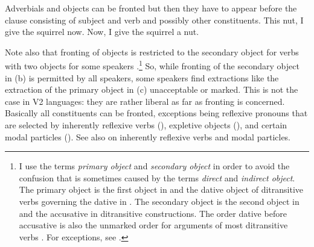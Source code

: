 \eal
{}
\zl 
Adverbials and objects can be fronted but then they have to appear before the clause consisting of
subject and verb and possibly other constituents.
\eal
\ex This nut, I give the squirrel now. 
\ex Now, I give the squirrel a nut.
\zl

\noindent
Note also that fronting of objects is restricted to the secondary object for verbs with two objects
for some speakers \citep[]{Hudson92a-u}.\footnote{
  I use the terms \emph{primary object} and \emph{secondary
    object} \citep[280]{PS92a} in order to avoid the confusion that is sometimes
  caused by the terms \emph{direct} and \emph{indirect object}. The primary object is the first object in 
  and the dative object of ditransitive verbs governing the dative in . The secondary object
  is the second object in  and the accusative in  ditransitive constructions. The order
  dative before accusative is also the unmarked order for arguments of most ditransitive verbs
  \citep{Hoehle82a}. For exceptions, see .
} So, while fronting of the secondary object in
(b) is permitted by all speakers, some speakers find extractions like the extraction of the
primary object in (c) unacceptable or marked.
\vspace{-\baselineskip}
\eal
\judgewidth{\%}
\zl
This is not the case in V2 languages: they are rather liberal as far as fronting
is concerned. Basically all constituents can be fronted, exceptions being reflexive
pronouns that are selected by inherently reflexive verbs (), expletive objects (), and certain modal
particles (). See also  on inherently reflexive
verbs and modal particles.
\eal
{}
